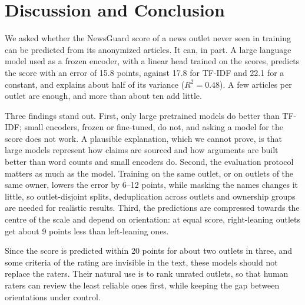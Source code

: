 \documentclass[11pt,a4paper]{article}
\begin{document}
\section{Discussion and Conclusion}\label{sec:conclusion}
We asked whether the NewsGuard score of a news outlet never seen in training can be predicted from its anonymized
articles. It can, in part. A large language model used as a frozen encoder, with a linear head trained on the scores,
predicts the score with an error of 15.8 points, against 17.8 for TF-IDF and 22.1 for a constant, and explains about
half of its variance ($R^2 = 0.48$). A few articles per outlet are enough, and more than about ten add little.

Three findings stand out. First, only large pretrained models do better than TF-IDF; small encoders, frozen or
fine-tuned, do not, and asking a model for the score does not work. A plausible explanation, which we cannot prove, is
that large models represent how claims are sourced and how arguments are built better than word counts and small
encoders do. Second, the evaluation protocol matters as much as the model. Training on the same outlet, or on outlets of
the same owner, lowers the error by 6--12 points, while masking the names changes it little, so outlet-disjoint splits,
deduplication across outlets and ownership groups are needed for realistic results. Third, the predictions are
compressed towards the centre of the scale and depend on orientation: at equal score, right-leaning outlets get about 9
points less than left-leaning ones.

Since the score is predicted within 20 points for about two outlets in three, and some criteria of the rating are
invisible in the text, these models should not replace the raters. Their natural use is to rank unrated outlets, so that
human raters can review the least reliable ones first, while keeping the gap between orientations under control.
\end{document}
